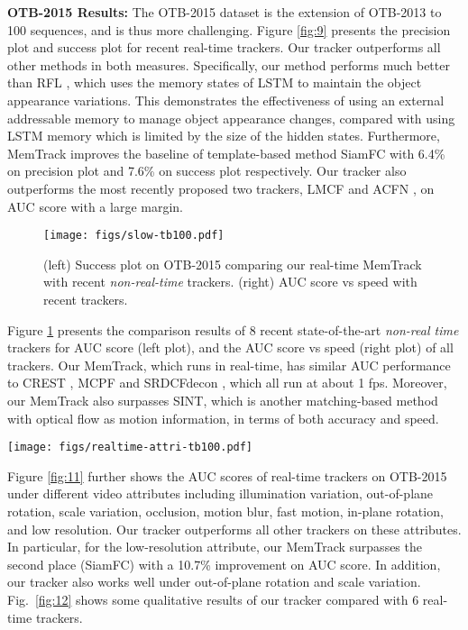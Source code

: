 \documentclass[runningheads]{llncs}
\begin{document}
\textbf{OTB-2015 Results:} The OTB-2015 \cite{Wu2015} dataset is the extension of OTB-2013 to 100 sequences, and is thus more challenging.
Figure \ref{fig:9} presents the precision plot and success plot for recent real-time trackers. Our tracker outperforms all other methods in both measures. Specifically, our method performs much better than RFL \cite{Yang2017}, which uses the memory states of LSTM to maintain the object appearance variations. This demonstrates the effectiveness of using an external addressable memory to manage object appearance changes, compared with using LSTM memory which is limited by the size of the hidden states.
Furthermore, MemTrack improves the baseline of template-based method SiamFC \cite{Bertinetto2016} with 6.4\% on precision plot and 7.6\% on success plot respectively. %
Our tracker also outperforms the most recently proposed two trackers, LMCF \cite{Wang2017} and ACFN \cite{Choi2017}, on AUC score with a large margin.
\begin{figure}[t]
	\begin{center}
		\texttt{[image: figs/slow-tb100.pdf]}
	\end{center}
	\caption{(left) Success plot on OTB-2015 comparing our real-time MemTrack with recent {\em non-real-time} trackers. (right) AUC score vs speed with recent trackers.}
	\label{fig:10}
\end{figure}
Figure \ref{fig:10} presents the comparison results of 8 recent state-of-the-art {\em non-real time} trackers for AUC score (left plot), and the AUC score vs speed (right plot) of all trackers.
Our MemTrack, which runs in real-time, has similar AUC performance to CREST \cite{Song2017}, MCPF \cite{Zhang2017} and SRDCFdecon \cite{Danelljan2016}, which all run at about 1 fps.
Moreover, our MemTrack also surpasses SINT, which is another matching-based method with optical flow as motion information, in terms of both accuracy and speed.
\begin{figure*}[t]
	\begin{center}
		\texttt{[image: figs/realtime-attri-tb100.pdf]}
	\end{center}
	\caption{The success plot of OTB-2015 on eight challenging attributes: illumination variation, out-of-plane rotation, scale variation, occlusion, motion blur, fast motion, in-plane rotation and low resolution }
	\label{fig:11}
\end{figure*}
Figure \ref{fig:11} further shows the AUC scores of real-time trackers on OTB-2015 under different video attributes including illumination variation, out-of-plane rotation, scale variation, occlusion, motion blur, fast motion, in-plane rotation, and low resolution. Our tracker outperforms all other trackers on these attributes. In particular, for the low-resolution attribute, our MemTrack surpasses the second place (SiamFC) with a 10.7\% improvement on AUC score. %
In addition, our tracker also works well under out-of-plane rotation and scale variation.
Fig.~\ref{fig:12} shows some qualitative results of our tracker compared with 6 real-time trackers. 
\end{document}
